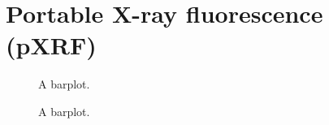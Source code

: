 \documentclass[
  a4paper,
  DIV=11,
  numbers=noendperiod]{scrreprt}
\begin{document}
\section{Portable X-ray fluorescence
(pXRF)}\label{portable-x-ray-fluorescence-pxrf}

\begin{figure}


\caption{\label{fig-lod-1}A barplot.}

\end{figure}%

\begin{figure}


\caption{\label{fig-lod-2}A barplot.}

\end{figure}%
\end{document}
